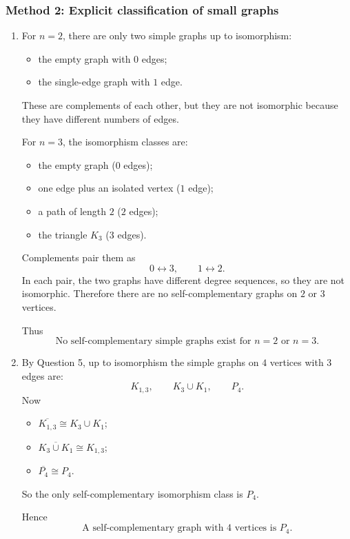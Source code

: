 \documentclass[12pt]{article}
\newcommand{\comp}[1]{\overline{#1}}
\begin{document}
\subsubsection{Method 2: Explicit classification of small graphs}
\begin{enumerate}[label=(\alph*)]
\item For \(n=2\), there are only two simple graphs up to isomorphism:
\begin{itemize}[leftmargin=*]
  \item the empty graph with \(0\) edges;
  \item the single-edge graph with \(1\) edge.
\end{itemize}
These are complements of each other, but they are not isomorphic because they have different numbers of edges.

For \(n=3\), the isomorphism classes are:
\begin{itemize}[leftmargin=*]
  \item the empty graph (\(0\) edges);
  \item one edge plus an isolated vertex (\(1\) edge);
  \item a path of length \(2\) (\(2\) edges);
  \item the triangle \(K_3\) (\(3\) edges).
\end{itemize}
Complements pair them as
\[
0 \leftrightarrow 3,\qquad 1 \leftrightarrow 2.
\]
In each pair, the two graphs have different degree sequences, so they are not isomorphic. Therefore there are no self-complementary graphs on \(2\) or \(3\) vertices.

Thus
\[
\boxed{\text{No self-complementary simple graphs exist for \(n=2\) or \(n=3\).}}
\]

\item By Question 5, up to isomorphism the simple graphs on \(4\) vertices with \(3\) edges are:
\[
K_{1,3},\qquad K_3\cup K_1,\qquad P_4.
\]
Now
\begin{itemize}[leftmargin=*]
  \item \(\comp{K_{1,3}}\cong K_3\cup K_1\);
  \item \(\comp{K_3\cup K_1}\cong K_{1,3}\);
  \item \(\comp{P_4}\cong P_4\).
\end{itemize}
So the only self-complementary isomorphism class is \(P_4\).

Hence
\[
\boxed{\text{A self-complementary graph with \(4\) vertices is }P_4.}
\]
\end{enumerate}
\end{document}
